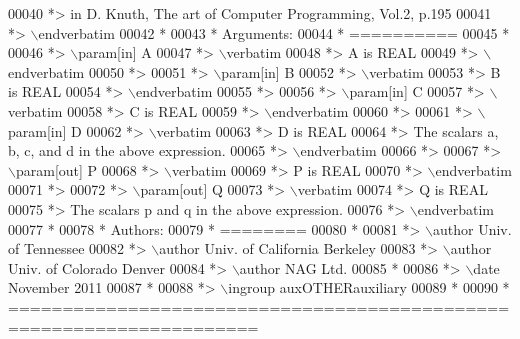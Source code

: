 \begin{DoxyCode}
00040 \textcolor{comment}{*> in D. Knuth, The art of Computer Programming, Vol.2, p.195}
00041 \textcolor{comment}{*> \(\backslash\)endverbatim}
00042 \textcolor{comment}{*}
00043 \textcolor{comment}{*  Arguments:}
00044 \textcolor{comment}{*  ==========}
00045 \textcolor{comment}{*}
00046 \textcolor{comment}{*> \(\backslash\)param[in] A}
00047 \textcolor{comment}{*> \(\backslash\)verbatim}
00048 \textcolor{comment}{*>          A is REAL}
00049 \textcolor{comment}{*> \(\backslash\)endverbatim}
00050 \textcolor{comment}{*>}
00051 \textcolor{comment}{*> \(\backslash\)param[in] B}
00052 \textcolor{comment}{*> \(\backslash\)verbatim}
00053 \textcolor{comment}{*>          B is REAL}
00054 \textcolor{comment}{*> \(\backslash\)endverbatim}
00055 \textcolor{comment}{*>}
00056 \textcolor{comment}{*> \(\backslash\)param[in] C}
00057 \textcolor{comment}{*> \(\backslash\)verbatim}
00058 \textcolor{comment}{*>          C is REAL}
00059 \textcolor{comment}{*> \(\backslash\)endverbatim}
00060 \textcolor{comment}{*>}
00061 \textcolor{comment}{*> \(\backslash\)param[in] D}
00062 \textcolor{comment}{*> \(\backslash\)verbatim}
00063 \textcolor{comment}{*>          D is REAL}
00064 \textcolor{comment}{*>          The scalars a, b, c, and d in the above expression.}
00065 \textcolor{comment}{*> \(\backslash\)endverbatim}
00066 \textcolor{comment}{*>}
00067 \textcolor{comment}{*> \(\backslash\)param[out] P}
00068 \textcolor{comment}{*> \(\backslash\)verbatim}
00069 \textcolor{comment}{*>          P is REAL}
00070 \textcolor{comment}{*> \(\backslash\)endverbatim}
00071 \textcolor{comment}{*>}
00072 \textcolor{comment}{*> \(\backslash\)param[out] Q}
00073 \textcolor{comment}{*> \(\backslash\)verbatim}
00074 \textcolor{comment}{*>          Q is REAL}
00075 \textcolor{comment}{*>          The scalars p and q in the above expression.}
00076 \textcolor{comment}{*> \(\backslash\)endverbatim}
00077 \textcolor{comment}{*}
00078 \textcolor{comment}{*  Authors:}
00079 \textcolor{comment}{*  ========}
00080 \textcolor{comment}{*}
00081 \textcolor{comment}{*> \(\backslash\)author Univ. of Tennessee }
00082 \textcolor{comment}{*> \(\backslash\)author Univ. of California Berkeley }
00083 \textcolor{comment}{*> \(\backslash\)author Univ. of Colorado Denver }
00084 \textcolor{comment}{*> \(\backslash\)author NAG Ltd. }
00085 \textcolor{comment}{*}
00086 \textcolor{comment}{*> \(\backslash\)date November 2011}
00087 \textcolor{comment}{*}
00088 \textcolor{comment}{*> \(\backslash\)ingroup auxOTHERauxiliary}
00089 \textcolor{comment}{*}
00090 \textcolor{comment}{*  =====================================================================}

\end{DoxyCode}
